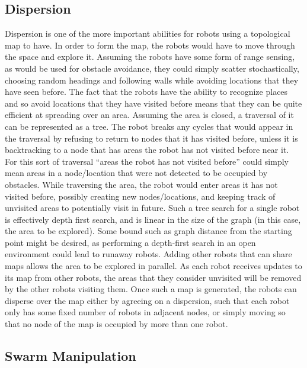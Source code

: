 \subsection{Dispersion}

Dispersion is one of the more important abilities for robots using a topological map to have. 
In order to form the map, the robots would have to move through the space and explore it. 
Assuming the robots have some form of range sensing, as would be used for obstacle avoidance, they could simply scatter stochastically, choosing random headings and following walls while avoiding locations that they have seen before. 
The fact that the robots have the ability to recognize places and so avoid locations that they have visited before means that they can be quite efficient at spreading over an area. 
Assuming the area is closed, a traversal of it can be represented as a tree. 
The robot breaks any cycles that would appear in the traversal by refusing to return to nodes that it has visited before, unless it is backtracking to a node that has areas the robot has not visited before near it. 
For this sort of traversal ``areas the robot has not visited before'' could simply mean areas in a node/location that were not detected to be occupied by obstacles. 
While traversing the area, the robot would enter areas it has not visited before, possibly creating new nodes/locations, and keeping track of unvisited areas to potentially visit in future. 
Such a tree search for a single robot is effectively depth first search, and is linear in the size of the graph (in this case, the area to be explored).
Some bound such as graph distance from the starting point might be desired, as performing a depth-first search in an open environment could lead to runaway robots. 
Adding other robots that can share maps allows the area to be explored in parallel. 
As each robot receives updates to its map from other robots, the areas that they consider unvisited will be removed by the other robots visiting them. 
Once such a map is generated, the robots can disperse over the map either by agreeing on a dispersion, such that each robot only has some fixed number of robots in adjacent nodes, or simply moving so that no node of the map is occupied by more than one robot. 

\subsection{Swarm Manipulation}

